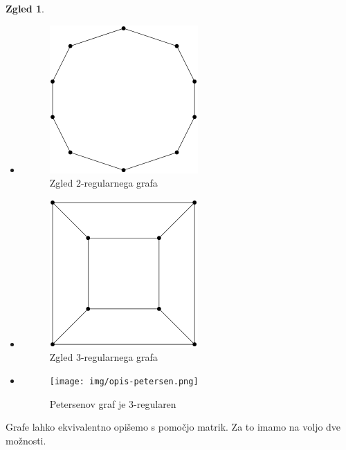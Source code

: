 \documentclass[11pt]{book}
\theoremstyle{definition}
\theoremstyle{zgled}
\newtheorem*{zgled}{Zgled}
\theoremstyle{odprtproblem}
\theoremstyle{domacanaloga}
\theoremstyle{izrek}
\begin{document}
\begin{zgled} \leavevmode
\begin{itemize}
    \item
    \begin{figure}[h]
        \centering
        \includegraphics[width=0.5\linewidth]{img/grafi-2reg.png}
        \caption{Zgled $2$-regularnega grafa}
    \end{figure}

    \item
    \begin{figure}[h]
        \centering
        \includegraphics[width=0.5\linewidth]{img/grafi-3reg.png}
        \caption{Zgled $3$-regularnega grafa}
    \end{figure}

    \item
    \begin{figure}[h]
        \centering
        \texttt{[image: img/opis-petersen.png]}
        \caption{Petersenov graf je $3$-regularen}
    \end{figure}
\end{itemize}
\end{zgled}

Grafe lahko ekvivalentno opišemo s pomočjo matrik. Za to imamo na voljo dve možnosti.
\end{document}
